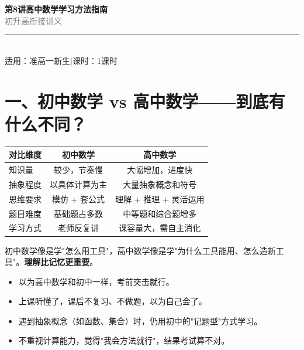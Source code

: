 \documentclass[12pt, a4paper]{ctexart}
\begin{document}
\begin{center}
{\Huge\bfseries\textcolor{mainblue}{第8讲\quad 高中数学学习方法指南}}\\[12pt]
{\Large\textcolor{gray}{初升高衔接讲义}}\\[8pt]
\rule{0.6\textwidth}{1pt}\\[8pt]
{\normalsize 适用：准高一新生\quad |\quad 课时：1课时}
\end{center}
\vspace{10pt}

\section*{\textcolor{mainblue}{一、初中数学 vs 高中数学——到底有什么不同？}}

\begin{knowledgebox}[初中到高中的三大变化]
\renewcommand{\arraystretch}{1.5}
\begin{center}
\begin{tabular}{l c c}
\toprule
\textbf{对比维度} & \textbf{初中数学} & \textbf{高中数学} \\
\midrule
知识量 & 较少，节奏慢 & 大幅增加，进度快 \\
抽象程度 & 以具体计算为主 & 大量抽象概念和符号 \\
思维要求 & 模仿 + 套公式 & 理解 + 推理 + 灵活运用 \\
题目难度 & 基础题占多数 & 中等题和综合题增多 \\
学习方式 & 老师反复讲 & 课容量大，需自主消化 \\
\bottomrule
\end{tabular}
\end{center}
\end{knowledgebox}

\begin{tipbox}[一句话概括]
初中数学像是学"怎么用工具"，高中数学像是学"为什么工具能用、怎么造新工具"。\textbf{理解比记忆更重要}。
\end{tipbox}

\begin{warnbox}[为什么很多同学高一数学就掉队？]
\begin{itemize}[leftmargin=2em]
  \item 以为高中数学和初中一样，考前突击就行。
  \item 上课听懂了，课后不复习、不做题，以为自己会了。
  \item 遇到抽象概念（如函数、集合）时，仍用初中的"记题型"方式学习。
  \item 不重视计算能力，觉得"我会方法就行"，结果考试算不对。
\end{itemize}
\end{warnbox}
\end{document}
